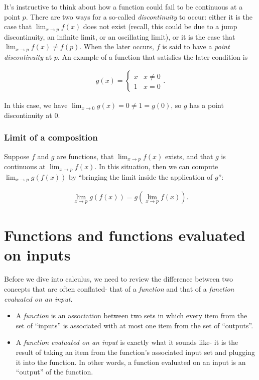 It's instructive to think about how a function could fail to be continuous at a point $p$. There are two ways for a so-called \textit{discontinuity} to occur: either it is the case that $\lim_{x \rightarrow p} f(x)$ does not exist (recall, this could be due to a jump discontinuity, an infinite limit, or an oscillating limit), or it is the case that $\lim_{x \rightarrow p} f(x) \neq f(p)$. When the later occurs, $f$ is said to have a \textit{point discontinuity} at $p$. An example of a function that satisfies the later condition is

\begin{align*}
    g(x) =
    \begin{cases}
        x & x \neq 0 \\
        1 & x = 0
    \end{cases}.
\end{align*}

In this case, we have $\lim_{x \rightarrow 0} g(x) = 0 \neq 1 = g(0)$, so $g$ has a point discontinuity at $0$.

\subsubsection*{Limit of a composition}

Suppose $f$ and $g$ are functions, that $\lim_{x \rightarrow p} f(x)$ exists, and that $g$ is continuous at $\lim_{x \rightarrow p} f(x)$. In this situation, then we can compute $\lim_{x \rightarrow p} g(f(x))$ by ``bringing the limit inside the application of $g$'': 

\begin{align*}
    {\lim_{x \rightarrow p} g(f(x)) = g(\lim_{x \rightarrow p}f(x))}.
\end{align*}

\newpage

\section*{Functions and functions evaluated on inputs}

Before we dive into calculus, we need to review the difference between two concepts that are often conflated- that of a \textit{function} and that of a \textit{function evaluated on an input}. 

\begin{itemize}
    \item A \textit{function} is an association between two sets in which every item from the set of ``inputs'' is associated with at most one item from the set of ``outputs''.
    \item A \textit{function evaluated on an input} is exactly what it sounds like- it is the result of taking an item from the function's associated input set and plugging it into the function. In other words, a function evaluated on an input is an ``output'' of the function.
\end{itemize}

